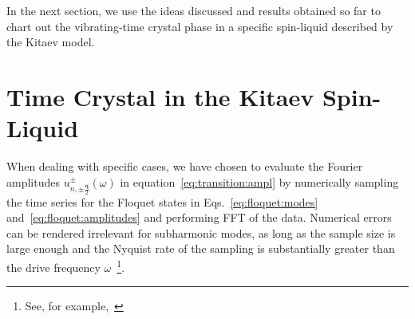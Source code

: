 \documentclass[preprint,5p,times,twocolumn]{elsarticle}
\newcommand{\bmq}{\bm{q}}
\begin{document}
In the next section, we use the ideas discussed and results obtained so far to chart out the vibrating-time crystal phase in a specific spin-liquid described by the Kitaev model.

\section{Time Crystal in the Kitaev Spin-Liquid}
\label{sec:kitaev}
When dealing with specific cases, we have chosen to evaluate the Fourier amplitudes $u_{n,\pm\frac{\bmq}{2}}^{\pm}(\omega)$ in equation~\ref{eq:transition:ampl} by numerically sampling the time series for the Floquet states in Eqs.~\ref{eq:floquet:modes} and~\ref{eq:floquet:amplitudes} and performing FFT of the data. Numerical errors can be rendered irrelevant for subharmonic modes, as long as the sample size is large enough and the Nyquist rate of the sampling is substantially greater than the drive frequency $\omega$~\footnote{See, for example,~\citep{Press2007}}.
\end{document}
